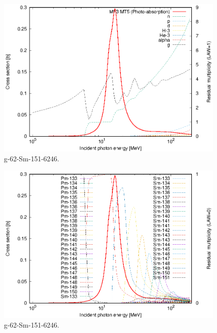 \begin{figure}
 \includegraphics[width=\linewidth]{eps/g_62-Sm-151_6246.eps}
  \caption{g-62-Sm-151-6246.}
\end{figure}
\begin{figure}
 \includegraphics[width=\linewidth]{eps-law0/g_62-Sm-151_6246.eps}
 \caption{g-62-Sm-151-6246.}
\end{figure}
\newpage \clearpage

